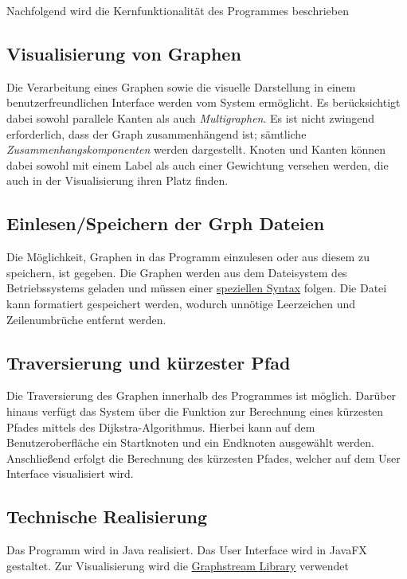 Nachfolgend wird die Kernfunktionalität des Programmes beschrieben

\subsection{Visualisierung von Graphen}
Die Verarbeitung eines Graphen sowie die visuelle Darstellung in einem benutzerfreundlichen Interface werden vom System ermöglicht. Es berücksichtigt dabei sowohl parallele Kanten als auch \textit{Multigraphen}. Es ist nicht zwingend erforderlich, dass der Graph zusammenhängend ist; sämtliche \textit{Zusammenhangskomponenten} werden dargestellt. Knoten und Kanten können dabei sowohl mit einem Label als auch einer Gewichtung versehen werden, die auch in der Visualisierung ihren Platz finden.

\subsection{Einlesen/Speichern der Grph Dateien}
Die Möglichkeit, Graphen in das Programm einzulesen oder aus diesem zu speichern, ist gegeben. Die Graphen werden aus dem Dateisystem des Betriebssystems geladen und müssen einer \hyperref[sec:syntax-grph]{speziellen Syntax} folgen. Die Datei kann formatiert gespeichert werden, wodurch unnötige Leerzeichen und Zeilenumbrüche entfernt werden.

\subsection{Traversierung und kürzester Pfad}
Die Traversierung des Graphen innerhalb des Programmes ist möglich. Darüber hinaus verfügt das System über die Funktion zur Berechnung eines kürzesten Pfades mittels des Dijkstra-Algorithmus. Hierbei kann auf dem Benutzeroberfläche ein Startknoten und ein Endknoten ausgewählt werden. Anschließend erfolgt die Berechnung des kürzesten Pfades, welcher auf dem User Interface visualisiert wird.

\subsection{Technische Realisierung}
Das Programm wird in Java realisiert. Das User Interface wird in JavaFX gestaltet. Zur Visualisierung wird die \href{https://graphstream-project.org/}{Graphstream Library} verwendet